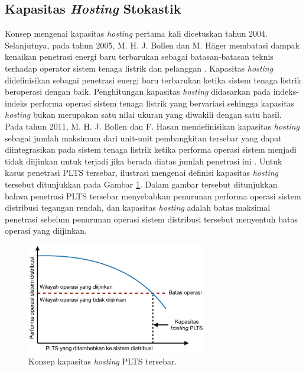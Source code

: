 {{\subsection{Kapasitas \textit{Hosting} Stokastik}
Konsep mengenai kapasitas \textit{hosting} pertama kali dicetuskan tahun 2004. Selanjutnya, pada tahun 2005, M. H. J. Bollen dan M. H\"{a}ger membatasi dampak kenaikan penetrasi energi baru terbarukan sebagai batasan-batasan teknis terhadap operator sistem tenaga listrik dan pelanggan \cite{Bollen2005}. Kapasitas \textit{hosting} didefinisikan sebagai penetrasi energi baru terbarukan ketika sistem tenaga listrik beroperasi dengan baik. Penghitungan kapasitas \textit{hosting} didasarkan pada indeks-indeks performa operasi sistem tenaga listrik yang bervariasi sehingga kapasitas \textit{hosting} bukan merupakan satu nilai ukuran yang diwakili dengan satu hasil. Pada tahun 2011, M. H. J. Bollen dan F. Hasan mendefinisikan kapasitas \textit{hosting} sebagai jumlah maksimum dari unit-unit pembangkitan tersebar yang dapat diintegrasikan pada sistem tenaga listrik ketika performa operasi sistem menjadi tidak diijinkan untuk terjadi jika berada diatas jumlah penetrasi ini \cite{Bollen2011}. Untuk kasus penetrasi PLTS tersebar, ilustrasi mengenai definisi kapasitas \textit{hosting} tersebut ditunjukkan pada Gambar \ref{LimitPHC}. Dalam gambar tersebut ditunjukkan bahwa penetrasi PLTS tersebar menyebabkan penurunan performa operasi sistem distribusi tegangan rendah, dan kapasitas \textit{hosting} adalah batas maksimal penetrasi sebelum penurunan operasi sistem distribusi tersebut menyentuh batas operasi yang diijinkan.
\begin{figure}[!h]
	\centering
	\includegraphics[width=0.7\textwidth]{Fig/LimitPHC}
	\caption{Konsep kapasitas \textit{hosting} PLTS tersebar.}
	\label{LimitPHC}
\end{figure}

}}

